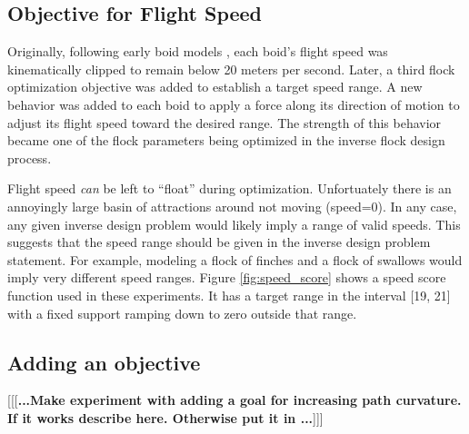 \documentclass[letterpaper]{article}
\begin{document}
\subsection{Objective for Flight Speed}
\label{subsec:speed_objective}

Originally, following early boid models \citep{reynolds_flocks_1987}, each boid's flight speed was kinematically clipped to remain below 20 meters per second. Later, a third flock optimization objective was added to establish a target speed range. A new behavior was added to each boid to apply a force along its direction of motion to adjust its flight speed toward the desired range. The strength of this behavior became one of the flock parameters being optimized in the inverse flock design process.

Flight speed \textit{can} be left to “float” during optimization. Unfortuately there is an annoyingly large basin of attractions around not moving (speed=0). In any case, any given inverse design problem would likely imply a range of valid speeds. This suggests that the speed range should be given in the inverse design problem statement. For example, modeling a flock of finches and a flock of swallows would imply very different speed ranges. Figure \ref{fig:speed_score} shows a speed score function used in these experiments. It has a target range in the interval [19, 21] with a fixed support ramping down to zero outside that range.

\subsection{Adding an objective}
\label{subsec:add_objective}

[[[\textbf{...Make experiment with adding a goal for increasing path curvature. If it works describe here. Otherwise put it in ...}]]]

\end{document}
